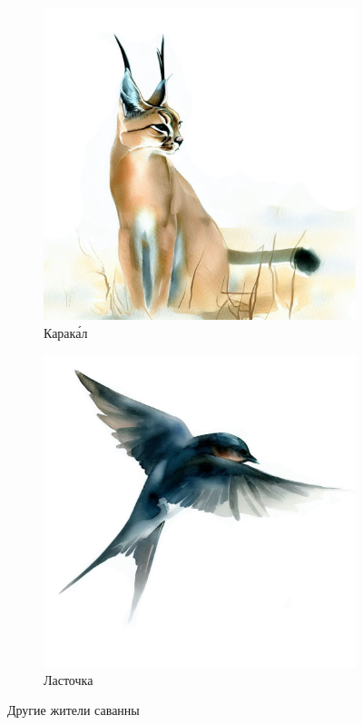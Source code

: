 \documentclass[a5paper,11pt]{memoir}
\begin{document}
\begin{figure}[t]
	\begin{subfigure}{.5\paperwidth}
		\centering
		\includegraphics[width=\linewidth]{images/caracal}
		\caption{Карак\'{а}л}
	\end{subfigure}
	\begin{subfigure}{.5\paperwidth}
	\centering
	\includegraphics[width=\linewidth]{images/swallow}
	\caption{Ласточка}
\end{subfigure}
	\caption{Другие жители саванны}
\end{figure}
\end{document}
